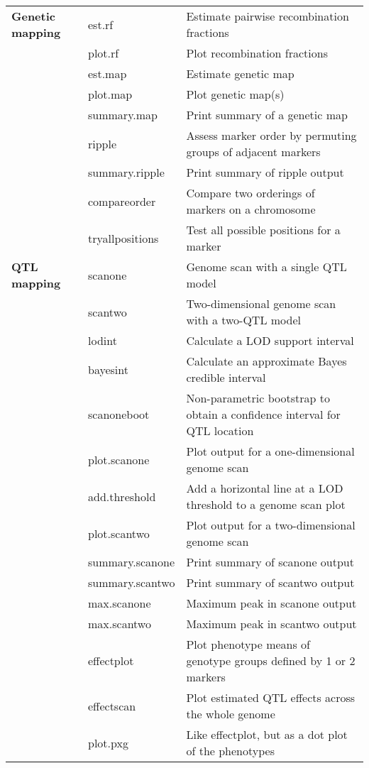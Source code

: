 \documentclass[10pt,letterpaper]{article}
\begin{document}
\noindent \begin{tabular}{lll} 
\hspace*{35mm} & \hspace*{25mm} & \hspace*{103mm} \\ 
\hline

\textbf{Genetic mapping} 
& est.rf & Estimate pairwise recombination fractions \\ 
& plot.rf & Plot recombination fractions \\ 
& est.map & Estimate genetic map \\
& plot.map & Plot genetic map(s) \\
& summary.map & Print summary of a genetic map \\
& ripple & Assess marker order by permuting groups of adjacent
markers \\
& summary.ripple & Print summary of ripple output \\ 
& compareorder & Compare two orderings of markers on a chromosome \\
& tryallpositions & Test all possible positions for a marker \\
\hline

\textbf{QTL mapping} 
& scanone & Genome scan with a single QTL model \\
& scantwo & Two-dimensional genome scan with a two-QTL model \\
& lodint & Calculate a LOD support interval \\
& bayesint & Calculate an approximate Bayes credible interval \\
& scanoneboot & Non-parametric bootstrap to obtain a confidence
interval for QTL location \\
& plot.scanone & Plot output for a one-dimensional genome scan \\
& add.threshold & Add a horizontal line at a LOD threshold to a genome scan plot \\
& plot.scantwo & Plot output for a two-dimensional genome scan \\ 
& summary.scanone & Print summary of scanone output \\
& summary.scantwo & Print summary of scantwo output \\ 
& max.scanone & Maximum peak in scanone output \\
& max.scantwo & Maximum peak in scantwo output \\
& effectplot & Plot phenotype means of genotype groups defined
by 1 or 2 markers \\
& effectscan & Plot estimated QTL effects across the whole genome \\
& plot.pxg & Like effectplot, but as a dot plot of the phenotypes \\ 
\hline


\end{tabular}
\end{document}

